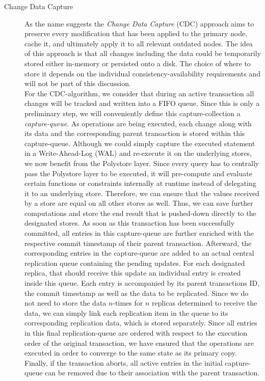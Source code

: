 \begin{description}
    \item [Change Data Capture]
     As the name suggests the \emph{Change Data Capture} (CDC) approach aims to preserve every modification that has been applied to the primary node, cache it, and ultimately
    apply it to all relevant outdated nodes. 
    The idea of this approach is that all changes including the data could be temporarily stored either in-memory or persisted onto a disk.
    The choice of where to store it depends on the individual consistency-availability requirements and will not be part of this discussion.\\
    For the CDC-algorithm, we consider that during an active transaction all changes will be tracked and written into a FIFO queue.
    Since this is only a preliminary step, we will conveniently define this capture-collection a \emph{capture-queue}.
    As operations are being executed, each change along with its data and the corresponding parent transaction is stored within this capture-queue.
    Although we could simply capture the executed statement in a Write-Ahead-Log (WAL) and re-execute it on the underlying stores, we now benefit from the Polystore layer.
    Since every query has to centrally pass the Polystore layer to be executed, it will pre-compute and evaluate certain functions or constraints internally at runtime instead of
    delegating it to an underlying store. Therefore, we can ensure that the values received by a store are equal on all other stores as well.
    Thus, we can save further computations and store the end result that is pushed-down directly
    to the designated stores. As soon as this transaction has been successfully committed, all entries in this capture-queue are further enriched with the respective commit timestamp of their parent transaction.
    Afterward, the corresponding entries in the capture-queue are added to an actual central replication queue containing the pending updates.
    For each designated replica, that should receive this update an individual entry is created inside this queue. 
    Each entry is accompanied by its parent transactions ID, the commit timestamp as well as the data to be replicated.
    Since we do not need to store the data $n$-times for $n$ replicas determined to receive the data, we can simply link each replication item in the queue to its 
    corresponding replication data, which is stored separately. 
    Since all entries in this final replication-queue are ordered with respect to the execution order of the original transaction,
    we have ensured that the operations are executed in order to converge to the same state as its primary copy.\\ 
    Finally, if the transaction aborts, all active entries in the initial capture-queue can be removed due to their association with the parent transaction.\\




\end{description}
